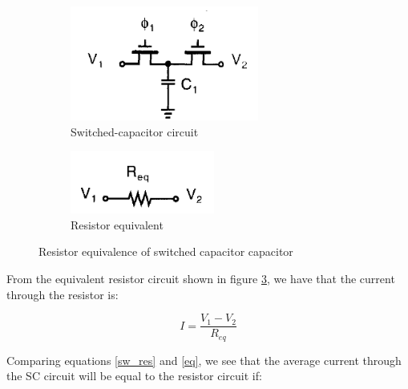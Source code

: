 \begin{figure}[h]
\begin{subfigure}[c]{0.4\linewidth}
\includegraphics[width=\linewidth]{images/switched_cap_res.png}
\caption{Switched-capacitor circuit}
\label{fig:switched_cap}
\end{subfigure}
\hfill
\begin{subfigure}[c]{0.3\linewidth}
\includegraphics[width=\linewidth]{images/res.png}
\caption{Resistor equivalent}
\label{fig:resistor}
\end{subfigure}

\caption{Resistor equivalence of switched capacitor capacitor}
\end{figure}

From the equivalent resistor circuit shown in figure \ref{fig:resistor}, we have that the current through the resistor is:

\begin{equation}\label{eq}
    I = \frac{V_1-V_2}{R_{eq}}
\end{equation}

Comparing equations \ref{sw_res} and \ref{eq}, we see that the average current through the SC circuit will be equal to the resistor circuit if:

